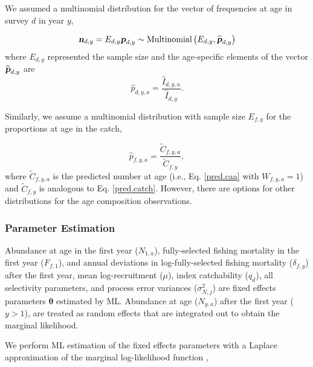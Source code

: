 \documentclass[12pt,letterpaper, leqno]{article}
\begin{document}
We assumed a multinomial distribution for the vector of frequencies at age in survey $d$ in year $y$, 

\vspace{-12pt}
\begin{equation}\label{multinom.dist}
\textbf{\textsl{n}}_{d,y} = E_{d,y} \textsl{\textbf{p}}_{d,y} \sim \text{Multinomial}\left(E_{d,y}, \widehat {\textsl{\textbf{p}}} _{d,y}\right)
\end{equation}
where $E_{d,y}$ represented the sample size and the age-specific elements of the vector $\widehat {\textsl{\textbf{p}}} _{d,y}$ are
\vspace{-12pt}
\begin{equation*}
  \widehat p_{d,y,a} = \frac{\widehat I_{d,y,a}}{\widehat I_{d,y}}.
\end{equation*}

Similarly, we assume a multinomial distribution with sample size $E_{f,y}$ for the proportions at age in the catch,

\vspace{-12pt}
\begin{equation*}
  \widehat p_{f,y,a} = \frac{\widetilde C_{f,y,a}}{\widetilde C_{f,y}},
\end{equation*}
where $\widetilde C_{f,y,a}$ is the predicted number at age (i.e., Eq. \ref{pred.caa} with $W_{f,y,a} = 1$) and $\widetilde C_{f,y}$ is analogous to Eq. \ref{pred.catch}. However, there are options for other distributions for the age composition observations.


\subsubsection*{Parameter Estimation}

Abundance at age in the first year ($N_{1,a}$), fully-selected fishing mortality in the first year ($F_{f,1}$), and annual deviations in log-fully-selected fishing mortality ($\delta_{f,y}$) after the first year, mean log-recruitment ($\mu$), index catchability ($q_d$), all selectivity parameters, and process error variances ($\sigma^2_{N,j}$) are fixed effects parameters $\bm{\theta}$ estimated by ML. Abundance at age ($N_{y,a}$) after the first year ($y>1$), are treated as random effects that are integrated out to obtain the marginal likelihood.

We perform ML estimation of the fixed effects parameters with a Laplace approximation of the marginal log-likelihood function \citep{skaugfournier06},
\end{document}
